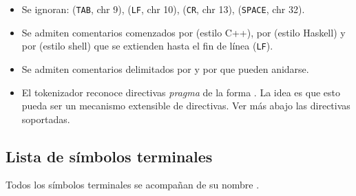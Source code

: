 \documentclass{article}
\begin{document}
\begin{itemize}
\item Se ignoran:
 (\texttt{TAB}, chr 9),
 (\texttt{LF}, chr 10),
 (\texttt{CR}, chr 13),
\chr{\,} (\texttt{SPACE}, chr 32).
\item Se admiten comentarios comenzados por \str{//} (estilo C++), por \str{--} (estilo Haskell) y por \str{\#} (estilo shell) que se extienden hasta el fin de l\'inea (\texttt{LF}).
\item Se admiten comentarios delimitados por \str{/*} \str{*/} y por \str{\{-} \str{-\}} que pueden anidarse.
\item El tokenizador reconoce directivas {\em pragma} de la forma . La idea es que esto pueda ser un mecanismo extensible de directivas. Ver m\'as abajo las directivas soportadas.
\end{itemize}

\subsection{Lista de s\'imbolos terminales}

Todos los s\'imbolos terminales se acompa\~nan de su nombre .\bigskip
\end{document}
